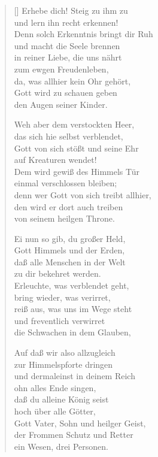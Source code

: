 \begin{multicols}{2}
\begin{verse}[\versewidth]
 Erhebe dich! Steig zu ihm zu\\
und lern ihn recht erkennen!\\
Denn solch Erkenntnis bringt dir Ruh\\
und macht die Seele brennen\\
in reiner Liebe, die uns nährt\\
zum ewgen Freudenleben,\\
da, was allhier kein Ohr gehört,\\
Gott wird zu schauen geben\\
den Augen seiner Kinder.

 Weh aber dem verstockten Heer,\\
das sich hie selbst verblendet,\\
Gott von sich stößt und seine Ehr\\
auf Kreaturen wendet!\\
Dem wird gewiß des Himmels Tür\\
einmal verschlossen bleiben;\\
denn wer Gott von sich treibt allhier,\\
den wird er dort auch treiben\\
von seinem heilgen Throne.

 Ei nun so gib, du großer Held,\\
Gott Himmels und der Erden,\\
daß alle Menschen in der Welt\\
zu dir bekehret werden.\\
Erleuchte, was verblendet geht,\\
bring wieder, was verirret,\\
reiß aus, was uns im Wege steht\\
und freventlich verwirret\\
die Schwachen in dem Glauben,

 Auf daß wir also allzugleich\\
zur Himmelspforte dringen\\
und dermaleinst in deinem Reich\\
ohn alles Ende singen,\\
daß du alleine König seist\\
hoch über alle Götter,\\
Gott Vater, Sohn und heilger Geist,\\
der Frommen Schutz und Retter\\
ein Wesen, drei Personen.

\end{verse}
\end{multicols}
